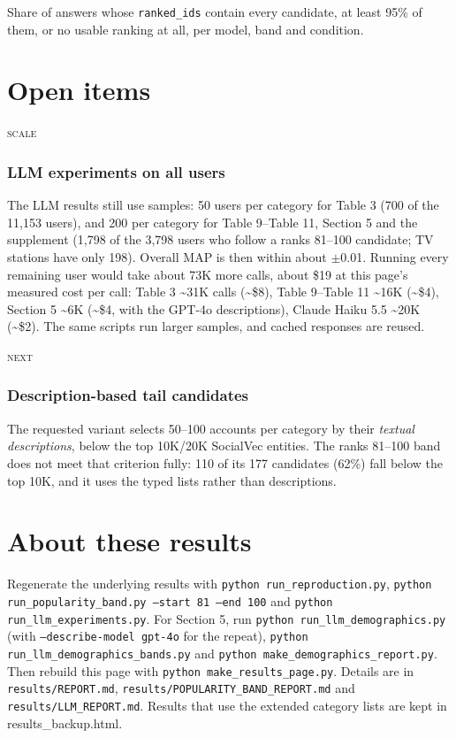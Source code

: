 \documentclass[10pt]{article}
\begin{document}
{\small Share of answers whose \texttt{ranked\_ids} contain every candidate, at least 95\% of them, or no usable ranking at all, per model, band and condition.}

\section{Open items}
\noindent\textsc{scale}\par
\subsubsection*{LLM experiments on all users}
The LLM results still use samples: 50 users per category for Table 3 (700 of the 11,153 users), and 200 per category for Table 9--Table 11, Section 5 and the supplement (1,798 of the 3,798 users who follow a ranks 81--100 candidate; TV stations have only 198). Overall MAP is then within about $\pm$0.01. Running every remaining user would take about 73K more calls, about \$19 at this page's measured cost per call: Table 3 \textasciitilde{}31K calls (\textasciitilde{}\$8), Table 9--Table 11 \textasciitilde{}16K (\textasciitilde{}\$4), Section 5 \textasciitilde{}6K (\textasciitilde{}\$4, with the GPT-4o descriptions), Claude Haiku 5.5 \textasciitilde{}20K (\textasciitilde{}\$2). The same scripts run larger samples, and cached responses are reused.

\noindent\textsc{next}\par
\subsubsection*{Description-based tail candidates}
The requested variant selects 50--100 accounts per category by their \emph{textual descriptions}, below the top 10K/20K SocialVec entities. The ranks 81--100 band does not meet that criterion fully: 110 of its 177 candidates (62\%) fall below the top 10K, and it uses the typed lists rather than descriptions.

\section*{About these results}
Regenerate the underlying results with \texttt{python run\_reproduction.py}, \texttt{python run\_popularity\_band.py --start 81 --end 100} and \texttt{python run\_llm\_experiments.py}. For Section 5, run \texttt{python run\_llm\_demographics.py} (with \texttt{--describe-model gpt-4o} for the repeat), \texttt{python run\_llm\_demographics\_bands.py} and \texttt{python make\_demographics\_report.py}. Then rebuild this page with \texttt{python make\_results\_page.py}. Details are in \texttt{results/REPORT.md}, \texttt{results/POPULARITY\_BAND\_REPORT.md} and \texttt{results/LLM\_REPORT.md}. Results that use the extended category lists are kept in results\_backup.html.
\end{document}
